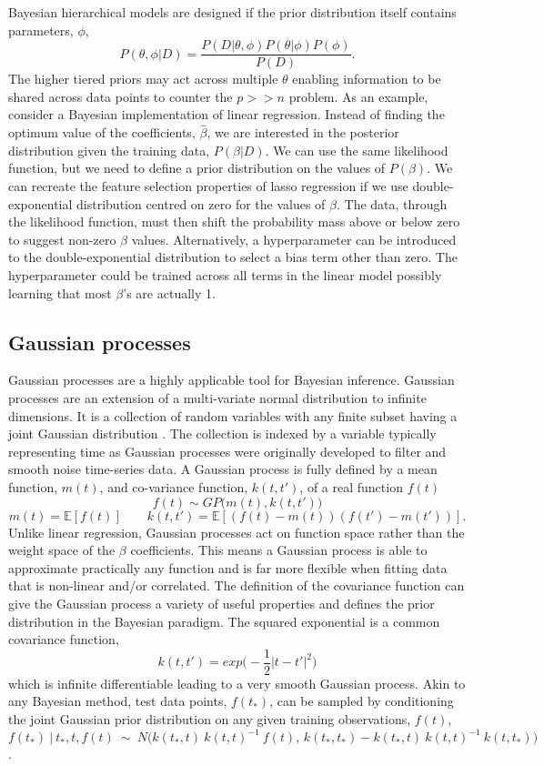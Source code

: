\documentclass[../main.tex]{subfiles}
\begin{document}
Bayesian hierarchical models are designed if the prior distribution itself contains parameters, $\phi$, 
$$P(\theta, \phi|D) = \frac{P(D|\theta,\phi)P(\theta|\phi)P(\phi)}{P(D)}.$$
The higher tiered priors may act across multiple $\theta$ enabling information to be shared across data points to counter the $p >> n$ problem.
As an example, consider a Bayesian implementation of linear regression.
Instead of finding the optimum value of the coefficients, $\hat{\beta}$, we are interested in the posterior distribution given the training data, $P(\beta|D)$.
We can use the same likelihood function, but we need to define a prior distribution on the values of $P(\beta)$.
We can recreate the feature selection properties of lasso regression if we use double-exponential distribution centred on zero for the values of $\beta$.
The data, through the likelihood function, must then shift the probability mass above or below zero to suggest non-zero $\beta$ values.
Alternatively, a hyperparameter can be introduced to the double-exponential distribution to select a bias term other than zero.
The hyperparameter could be trained across all terms in the linear model possibly learning that most $\beta$'s are actually 1.

\subsection{Gaussian processes}

Gaussian processes are a highly applicable tool for Bayesian inference.
Gaussian processes are an extension of a multi-variate normal distribution to infinite dimensions.
It is a collection of random variables with any finite subset having a joint Gaussian distribution \parencite{Rasmussen2005}.
The collection is indexed by a variable typically representing time as Gaussian processes were originally developed to filter and smooth noise time-series data. 
A Gaussian process is fully defined by a mean function, $m(t)$, and co-variance function, $k(t,t')$, of a real function $f(t)$
$$f(t)\sim GP\big(m(t),k(t,t')\big)$$
$$m(t) = \mathbb{E}[f(t)] \qquad k(t,t') = \mathbb{E}[(f(t) - m(t))(f(t') - m(t'))].$$
Unlike linear regression, Gaussian processes act on function space rather than the weight space of the $\beta$ coefficients. 
This means a Gaussian process is able to approximate practically any function and is far more flexible when fitting data that is non-linear and/or correlated.
The definition of the covariance function can give the Gaussian process a variety of useful properties and defines the prior distribution in the Bayesian paradigm.
The squared exponential is a common covariance function,
$$k(t,t') = exp\big(-\frac{1}{2}|t - t'|^2\big)$$
which is infinite differentiable leading to a very smooth Gaussian process.
Akin to any Bayesian method, test data points, $f(t_{*})$, can be sampled by conditioning the joint Gaussian prior distribution on any given training observations, $f(t)$,
$$f(t_{*})\ |\ t_{*},t,f(t)\ \sim\ N\Big(k(t_{*},t)\ k(t,t)^{-1}\ f(t),\, k(t_{*},t_{*})-k(t_{*},t)\ k(t,t)^{-1}\ k(t,t_{*})\Big)$$.
\end{document}
